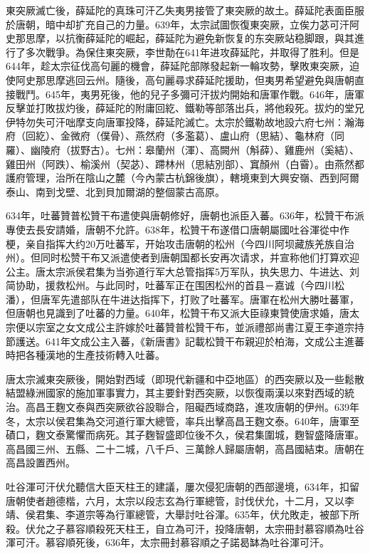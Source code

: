東突厥滅亡後，薛延陀的真珠可汗乙失夷男接管了東突厥的故土。薛延陀表面臣服於唐朝，暗中却扩充自己的力量。639年，太宗試圖恢復東突厥，立俟力苾可汗阿史那思摩，以抗衡薛延陀的崛起，薛延陀为避免新恢复的东突厥站稳脚跟，與其進行了多次戰爭。為保住東突厥，李世勣在641年进攻薛延陀，并取得了胜利。但是644年，趁太宗征伐高句麗的機會，薛延陀部隊發起新一輪攻勢，擊敗東突厥，迫使阿史那思摩逃回云州。隨後，高句麗尋求薛延陀援助，但夷男希望避免與唐朝直接戰鬥。645年，夷男死後，他的兒子多彌可汗拔灼開始和唐軍作戰。646年，唐軍反擊並打敗拔灼後，薛延陀的附庸回紇、鐵勒等部落出兵，將他殺死。拔灼的堂兄伊特勿失可汗咄摩支向唐軍投降，薛延陀滅亡。太宗於鐵勒故地設六府七州：瀚海府（回紇）、金微府（僕骨）、燕然府（多濫葛）、盧山府（思結）、龜林府（同羅）、幽陵府（拔野古）。七州：皋蘭州（渾）、高闕州（斛薛）、雞鹿州（奚結）、雞田州（阿跌）、榆溪州（契苾）、蹛林州（思結別部）、窴顏州（白霫）。由燕然都護府管理，治所在陰山之麓（今內蒙古杭錦後旗），轄境東到大興安嶺、西到阿爾泰山、南到戈壁、北到貝加爾湖的整個蒙古高原。

634年，吐蕃贊普松贊干布遣使與唐朝修好，唐朝也派臣入蕃。636年，松贊干布派專使去長安請婚，唐朝不允許。638年，松贊干布遂借口唐朝屬國吐谷渾從中作梗，亲自指挥大约20万吐蕃军，开始攻击唐朝的松州（今四川阿坝藏族羌族自治州）。但同时松赞干布又派遣使者到唐朝国都长安再次请求，并宣称他们打算欢迎公主。唐太宗派侯君集为当弥道行军大总管指挥5万军队，执失思力、牛进达、刘简协助，援救松州。与此同时，吐蕃军正在围困松州的首县－嘉诚（今四川松潘），但唐军先遣部队在牛进达指挥下，打败了吐蕃军。唐軍在松州大勝吐蕃軍，但唐朝也見識到了吐蕃的力量。640年，松贊干布又派大臣祿東贊使唐求婚，唐太宗便以宗室之女文成公主許嫁於吐蕃贊普松贊干布，並派禮部尚書江夏王李道宗持節護送。641年文成公主入蕃，《新唐書》記載松贊干布親迎於柏海，文成公主進蕃時把各種漢地的生產技術轉入吐蕃。

唐太宗滅東突厥後，開始對西域（即現代新疆和中亞地區）的西突厥以及一些鬆散結盟綠洲國家的施加軍事實力，其主要針對西突厥，以恢復兩漢以來對西域的統治。高昌王麴文泰與西突厥欲谷設聯合，阻礙西域商路，進攻唐朝的伊州。639年冬，太宗以侯君集為交河道行軍大總管，率兵出擊高昌王麴文泰。640年，唐軍至磧口，麴文泰驚懼而病死。其子麴智盛即位後不久，侯君集圍城，麴智盛降唐軍。高昌國三州、五縣、二十二城，八千戶、三萬餘人歸屬唐朝，高昌國結束。唐朝在高昌設置西州。

吐谷渾可汗伏允聽信大臣天柱王的建議，屢次侵犯唐朝的西部邊境，634年，扣留唐朝使者趙德楷，六月，太宗以段志玄為行軍總管，討伐伏允，十二月，又以李靖、侯君集、李道宗等為行軍總管，大舉討吐谷渾。635年，伏允敗走，被部下所殺。伏允之子慕容順殺死天柱王，自立為可汗，投降唐朝，太宗冊封慕容順為吐谷渾可汗。慕容順死後，636年，太宗冊封慕容順之子諾曷缽為吐谷渾可汗。

